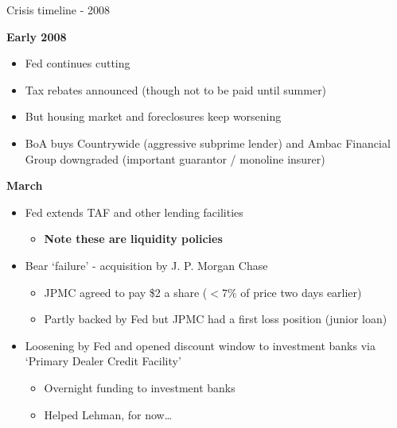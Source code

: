 

\begin{frame}{Crisis timeline - 2008}

\textbf{Early 2008}
	\begin{itemize}
	\item	Fed continues cutting
	\item	Tax rebates announced (though not to be paid until summer)
	\item	But housing market and foreclosures keep worsening
	\item	BoA buys Countrywide (aggressive subprime lender) and Ambac Financial Group downgraded (important guarantor / monoline insurer)
	\end{itemize}
\vspace{2mm}
\textbf{March}
	\begin{itemize}
	\item	Fed extends TAF and other lending facilities
		\begin{itemize}
		\item	\textbf{Note these are liquidity policies}
		\end{itemize}
	\item	Bear `failure' - acquisition by J. P. Morgan Chase
		\begin{itemize}
		\item	JPMC agreed to pay \$2 a share ($<7\%$ of price two days earlier)
		\item	Partly backed by Fed but JPMC had a first loss position (junior loan)
		\end{itemize}
	\item	Loosening by Fed and opened discount window to investment banks via `Primary Dealer Credit Facility'
		\begin{itemize}
		\item	Overnight funding to investment banks
		\item	Helped Lehman, for now\ldots
		\end{itemize}
	\end{itemize}

\end{frame}


